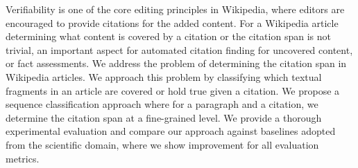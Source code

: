 Verifiability is one of the core editing principles in Wikipedia, where editors are encouraged to provide  citations for the added content. For a Wikipedia article determining what content is covered by a citation or the citation span is not trivial, an important aspect for automated citation finding for uncovered content, or fact assessments. We address the problem of determining the citation span in Wikipedia articles. We approach this problem by classifying which textual fragments in an article are covered or hold true given a citation. We propose a sequence classification approach where for a paragraph and a citation, we determine the citation span at a fine-grained level. We provide a thorough experimental evaluation and compare our approach against baselines adopted from the scientific domain, where we show improvement for all evaluation metrics.
